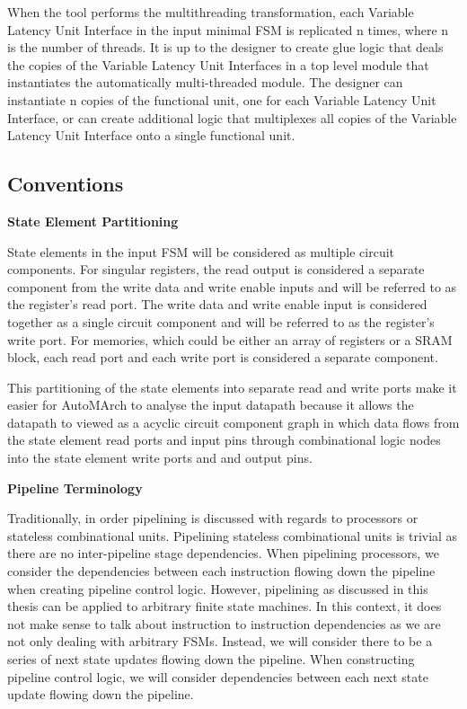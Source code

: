 When the tool performs the multithreading transformation, each Variable Latency Unit Interface in the input minimal FSM is replicated n times, where n is the number of threads. It is up to the designer to create glue logic that deals the copies of the Variable Latency Unit Interfaces in a top level module that instantiates the automatically multi-threaded module. The designer can instantiate n copies of the functional unit, one for each Variable Latency Unit Interface, or can create additional logic that multiplexes all copies of the Variable Latency Unit Interface onto a single functional unit.

\subsection{Conventions}
\label{section:conventions}
{\bf State Element Partitioning}

State elements in the input FSM will be considered as multiple circuit components. For singular registers, the read output is considered a separate component from the write data and write enable inputs and will be referred to as the register's read port. The write data and write enable input is considered together as a single circuit component and will be referred to as the register's write port. For memories, which could be either an array of registers or a SRAM block, each read port and each write port is considered a separate component. 

This partitioning of the state elements into separate read and write ports make it easier for AutoMArch to analyse the input datapath because it allows the datapath to viewed as a acyclic circuit component graph in which data flows from the state element read ports and input pins through combinational logic nodes into the state element write ports and and output pins.

{\bf Pipeline Terminology}

Traditionally, in order pipelining is discussed with regards to processors or stateless combinational units. Pipelining stateless combinational units is trivial as there are no inter-pipeline stage dependencies. When pipelining processors, we consider the dependencies between each instruction flowing down the pipeline when creating pipeline control logic. However, pipelining as discussed in this thesis can be applied to arbitrary finite state machines. In this context, it does not make sense to talk about instruction to instruction dependencies as we are not only dealing with arbitrary FSMs. Instead, we will consider there to be a series of next state updates flowing down the pipeline. When constructing pipeline control logic, we will consider dependencies between each next state update flowing down the pipeline.

